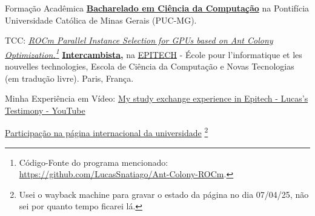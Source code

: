\begin{rubric}{Formação Acadêmica}
\entry*[2019 -- 2023]%
    \textbf{\href{https://drive.google.com/file/d/1c2m8jONNZnZUBY8lnjcAZ_gO1ZWcIsyu/view?usp=sharing}{Bacharelado em Ciência da Computação}} na Pontifícia Universidade Católica de Minas Gerais (PUC-MG).
    \par TCC: \emph{\href{https://media.githubusercontent.com/media/LucasSnatiago/TCC/main/main.pdf}
    {ROCm Parallel Instance Selection for GPUs based on Ant Colony Optimization.}\footnote{Código-Fonte do programa mencionado: \href{https://github.com/LucasSnatiago/Ant-Colony-ROCm}{https://github.com/LucasSnatiago/Ant-Colony-ROCm}.}}
%
\entry*[2023/1]%
    \textbf{\href{https://drive.google.com/file/d/18yGVDfS8qOwmM7TXN-m8jqI3r0iMvm-3/view?usp=sharing}{Intercambista},} na \href{https://epitech.eu/}{EPITECH} - École pour l'informatique et les nouvelles technologies, Escola de Ciência da Computação e Novas Tecnologias (em tradução livre). Paris, França. \par
    Minha Experiência em Vídeo: \href{https://youtu.be/rOP5lxGcNaE}{My study exchange experience in Epitech - Lucas's Testimony - YouTube} \par
    \href{https://web.archive.org/web/20250407145959/https://international.epitech.eu/#h-voices-of-our-international-students}{Participação na página internacional da universidade}
    \footnote{Usei o wayback machine para gravar o estado da página no dia 07/04/25, não sei por quanto tempo ficarei lá.}
%
\end{rubric}
